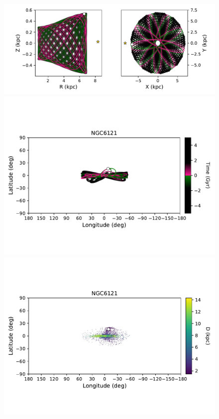             \twocolumn
            \begin{figure}
                \begin{center}
                    \includegraphics[clip=true, trim = 0mm 2mm 0mm 0mm, width=0.9\columnwidth]{images/PII_individual_NGC6121_NGC6121orbitRZXY.pdf}

                    \includegraphics[clip=true, trim = 0mm 20mm 0mm 10mm, width=0.9\columnwidth]{images/PII_individual_NGC6121_NGC6121orbit.pdf}

                    \includegraphics[clip=true, trim = 0mm 20mm 0mm 10mm, width=0.9\columnwidth]{images/PII_individual_NGC6121_NGC6121_LB_D.pdf}


\end{center}
\end{figure}

